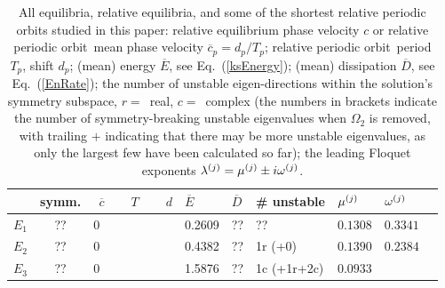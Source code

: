 \documentclass[aip,cha,showpacs,reprint]{revtex4-1} %
\newcommand{\refeq}  [1] {Eq.~(\ref{#1})}                   %
\newcommand{\ExpaEig}{\ensuremath{\Lambda}}
\newcommand{\eigExp}[1][]{
\ifthenelse{\equal{#1}{}}{\ensuremath{\lambda}}{\ensuremath{\lambda^{(#1)}}}
                        }
\newcommand{\eigRe}[1][]{
\ifthenelse{\equal{#1}{}}{\ensuremath{\mu}}{\ensuremath{\mu^{(#1)}}}
                        }
\newcommand{\eigIm}[1][]{
  \ifthenelse{\equal{#1}{}}{\ensuremath{\omega}}{\ensuremath{\omega^{(#1)}}}
            }
\newcommand{\eqva}{equilib\-ria}
\newcommand{\reqva}{rela\-ti\-ve equilib\-ria}
\newcommand{\rpo}{rela\-ti\-ve periodic orbit}
\newcommand{\period}[1]{{\ensuremath{T_{#1}}}}
\newcommand{\shift}{\ensuremath{d}}
\newcommand{\EQV}[1]{\ensuremath{E_{#1}}}
\newcommand{\REQV}[2]{\ensuremath{TW_{#1#2}}} %
\newcommand{\velRel}{\ensuremath{c}}    %
\newcommand{\timeAver} [1]{\overline{#1}}
\begin{document}
\begin{table}
   \caption{\label{tab:RPOs}
      All \eqva, \reqva, and some of the shortest \rpo s studied in this
      paper: rela\-ti\-ve equilib\-rium phase velocity $\velRel$
      or \rpo\ mean phase velocity
      $\timeAver{\velRel}_p= \shift_p/\period{p}$;
      \rpo\ period $\period{p}$, shift $\shift_p$;
      (mean) energy $\timeAver{E}$, see \refeq{ksEnergy};
      (mean) dissipation $\timeAver{D}$, see \refeq{EnRate};
      the number of unstable eigen-directions within the solution's
      symmetry subspace, $r= $~real, $c= $~complex (the numbers in
      brackets indicate the number of symmetry-breaking unstable
      eigenvalues when $\Omega_2$ is removed, with trailing $+$
      indicating that there may be more unstable eigenvalues, as only the
      largest few have been calculated so far);
      the leading  Floquet exponents
      $\eigExp[j]= \eigRe[j] \pm i\eigIm[j]$.
   }
   \centering
   \begin{tabular}{lclllllllll}
       & symm.           & $~~\timeAver{\velRel}$
                                   & ~~$\period{}$ &  ~~$\shift$
                                   & $\timeAver{E}$~~  & $\timeAver{D}$
                                   & \# unstable
                                   & $\eigRe[j]$ & $\eigIm[j]$
                                   \\
   \hline
   $\EQV{1}$ & ?? & 0 &&& 0.2609 & ??  & ??  & $0.1308$& $0.3341$ \\
   $\EQV{2}$ & ?? & 0 &&& 0.4382 & ?? & 1r (+0) & $0.1390$& $0.2384$ \\ %
   $\EQV{3}$ & ?? & 0 &&& 1.5876 & ?? & 1c (+1r+2c) & $0.0933$&         \\ %

\end{tabular}
\end{table}
\end{document}
